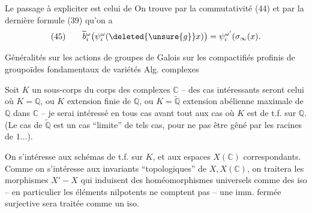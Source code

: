Le passage à expliciter est celui de
On trouve par la commutativité (44) et par la dernière formule (39) qu'on a
\[
(45)\qquad\widetilde b_i^\omega\bigl(\psi_i^\omega(\deleted{\unsure{g}}x)\bigr)=\psi_i^{\omega'}(\sigma_\infty(x).
\]

Généralités sur les actions de groupes de Galois sur les compactifiés profinis de groupoïdes fondamentaux de variétés Alg. complexes

Soit $K$ un sous-corps du corps des complexes $\mathbb C$ -- des cas intéressants seront celui où $K=\mathbb Q$, ou $K$ extension finie de $\mathbb Q$, ou $K=\widetilde{\mathbb Q}$ extension abélienne maximale de $\mathbb Q$ dans $\mathbb C$ -- je serai intéressé en tous cas avant tout aux cas où $K$ est de t.f. sur $\mathbb Q$. (Le cas de $\widetilde{\mathbb Q}$ est un cas ``limite'' de tels cas, pour ne pas être gêné par les racines de $1\ldots$).

On s'intéresse aux schémas  de t.f. sur $K$, et aux espaces  $X(\mathbb C)$ correspondants. Comme on s'intéresse aux invariants ``topologiques'' de $X,X(\mathbb C)$, on traitera les morphismes $X'-X$ qui induisent des homéomorphismes universels comme des iso -- en particulier les éléments nilpotents ne comptent pas -- une imm. fermée surjective sera traitée comme un iso.

